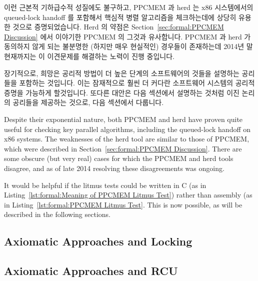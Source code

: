이런 근본적 기하급수적 성질에도 불구하고, PPCMEM 과 herd 는 x86 시스템에서의
queued-lock handoff 를 포함해서 핵심적 병렬 알고리즘을 체크하는데에 상당히
유용한 것으로 증명되었습니다.
Herd 의 약점은
Section~\ref{sec:formal:PPCMEM Discussion} 에서 이야기한 PPCMEM 의 그것과
유사합니다.
PPCMEM 과 herd 가 동의하지 않게 되는 불분명한 (하지만 매우 현실적인) 경우들이
존재하는데 2014년 말 현재까지는 이 이견문제를 해결하는 노력이 진행 중입니다.

장기적으로, 희망은 공리적 방법이 더 높은 단계의 소프트웨어의 것들을 설명하는
공리들을 포함하는 것입니다.
이는 잠재적으로 훨씬 더 커다란 소프트웨어 시스템의 공리적 증명을 가능하게
할것입니다.
또다른 대안은 다음 섹션에서 설명하는 것처럼 이진 논리의 공리들을 제공하는
것으로, 다음 섹션에서 다룹니다.
\iffalse

Despite their exponential nature, both PPCMEM and herd have proven quite
useful for checking key parallel algorithms, including the queued-lock
handoff on x86 systems.
The weaknesses of the herd tool are similar to those of PPCMEM, which
were described in
Section~\ref{sec:formal:PPCMEM Discussion}.
There are some obscure (but very real) cases for which the PPCMEM and
herd tools disagree, and as of late 2014 resolving these disagreements
was ongoing.

It would be helpful if the litmus tests could be written in C
(as in Listing~\ref{lst:formal:Meaning of PPCMEM Litmus Test})
rather than assembly
(as in Listing~\ref{lst:formal:PPCMEM Litmus Test}.
This is now possible, as will be described in the following sections.

\subsection{Axiomatic Approaches and Locking}
\label{sec:formal:Axiomatic Approaches and Locking}

\subsection{Axiomatic Approaches and RCU}
\label{sec:formal:Axiomatic Approaches and RCU}

